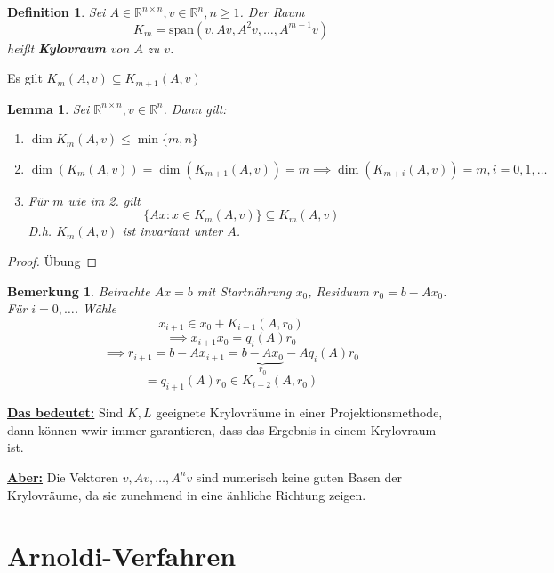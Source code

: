 \documentclass{book}
\newtheorem{lemma}[algorithm]{Lemma}
\newtheorem{definition}[algorithm]{Definition}
\newtheorem{remark}[algorithm]{Bemerkung}
\def\R{\mathbb{R}}
\begin{document}
            \begin{definition}\label{d3.9}
                Sei $A\in\R^{n\times n},v\in\R^n,n\geq 1$. Der Raum 
                \[K_m=\text{span}(v,Av,A^2v,\dots,A^{m-1}v)\]
                heißt \textbf{Kylovraum} von $A$ zu $v$.                
            \end{definition}

            Es gilt $K_m(A,v)\subseteq K_{m+1}(A,v)$

            \begin{lemma}\label{l3.10}
                Sei $\R^{n\times n},v\in\R^n$. Dann gilt:
                \begin{enumerate}
                    \item $\dim K_m(A,v)\leq \min\{m,n\}$
                    \item $\dim(K_m(A,v))=\dim(K_{m+1}(A,v))=m\implies \dim(K_{m+i}(A,v))=m,i=0,1,\dots$
                    \item Für $m$ wie im 2. gilt \[\{Ax:x\in K_m(A,v)\}\subseteq K_m(A,v)\]
                    D.h. $K_m(A,v)$ ist invariant unter $A$.
                \end{enumerate}
            \end{lemma}

            \begin{proof}
                Übung   
            \end{proof}

            \begin{remark}\label{b3.11}
                Betrachte $Ax=b$ mit Startnährung $x_0$, Residuum $r_0=b-Ax_0$. Für $i=0,\dots$. Wähle
                \[x_{i+1}\in x_0+K_{i-1}(A,r_0)\]
                \[\implies x_{i+1}x_0=q_i(A)r_0\]
                \[\implies r_{i+1}=b-Ax_{i+1}=\underbrace{b-Ax_0}_{r_0}-Aq_i(A)r_0\]
                \[=q_{i+1}(A)r_0\in K_{i+2}(A,r_0)\]
            \end{remark}

            \underline{\textbf{Das bedeutet:}} Sind $K,L$ geeignete Krylovräume in einer Projektionsmethode, dann können 
            wwir immer garantieren, dass das Ergebnis in einem Krylovraum ist.

            \underline{\textbf{Aber:}} Die Vektoren $v,Av,\dots,A^nv$ sind numerisch keine guten Basen der Krylovräume, da sie zunehmend in eine 
            änhliche Richtung zeigen.

        \section{Arnoldi-Verfahren}
\end{document}
